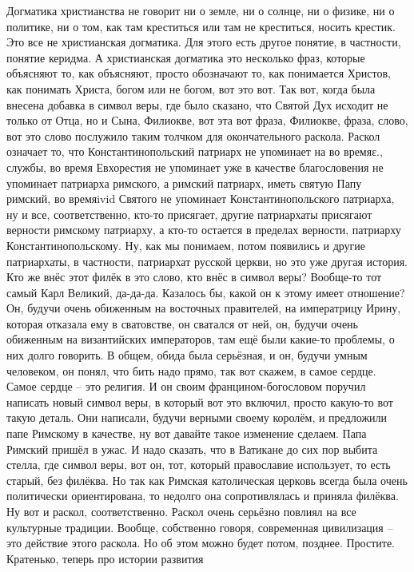 Догматика христианства не говорит ни о земле, ни о солнце, ни о физике, ни о
политике, ни о том, как там креститься или там не креститься, носить крестик.
Это все не христианская догматика. Для этого есть другое понятие, в частности,
понятие керидма. А христианская догматика это несколько фраз, которые объясняют
то, как объясняют, просто обозначают то, как понимается Христов, как понимать
Христа, богом или не богом, вот это вот. Так вот, когда была внесена добавка в
символ веры, где было сказано, что Святой Дух исходит не только от Отца, но и
Сына, Филиокве, вот эта вот фраза, Филиокве, фраза, слово, вот это слово
послужило таким толчком для окончательного раскола. Раскол означает то, что
Константинопольский патриарх не упоминает на во времяε., службы, во время
Евхорестия не упоминает уже в качестве благословения не упоминает патриарха
римского, а римский патриарх, иметь святую Папу римский, во времяivid Святого не
упоминает Константинопольского патриарха, ну и все, соответственно, кто-то
присягает, другие патриархаты присягают верности римскому патриарху, а кто-то
остается в пределах верности, патриарху Константинопольскому. Ну, как мы
понимаем, потом появились и другие патриархаты, в частности, патриархат русской
церкви, но это уже другая история. Кто же внёс этот филёк в это слово, кто внёс
в символ веры? Вообще-то тот самый Карл Великий, да-да-да. Казалось бы, какой он
к этому имеет отношение? Он, будучи очень обиженным на восточных правителей, на
императрицу Ирину, которая отказала ему в сватовстве, он сватался от ней, он,
будучи очень обиженным на византийских императоров, там ещё были какие-то
проблемы, о них долго говорить. В общем, обида была серьёзная, и он, будучи
умным человеком, он понял, что бить надо прямо, так вот скажем, в самое сердце.
Самое сердце – это религия. И он своим францином-богословом поручил написать
новый символ веры, в который вот это включил, просто какую-то вот такую деталь.
Они написали, будучи верными своему королём, и предложили папе Римскому в
качестве, ну вот давайте такое изменение сделаем. Папа Римский пришёл в ужас. И
надо сказать, что в Ватикане до сих пор выбита стелла, где символ веры, вот он,
тот, который православие использует, то есть старый, без филёква. Но так как
Римская католическая церковь всегда была очень политически ориентирована, то
недолго она сопротивлялась и приняла филёква. Ну вот и раскол, соответственно.
Раскол очень серьёзно повлиял на все культурные традиции. Вообще, собственно
говоря, современная цивилизация – это действие этого раскола. Но об этом можно
будет потом, позднее. Простите. Кратенько, теперь про истории развития
